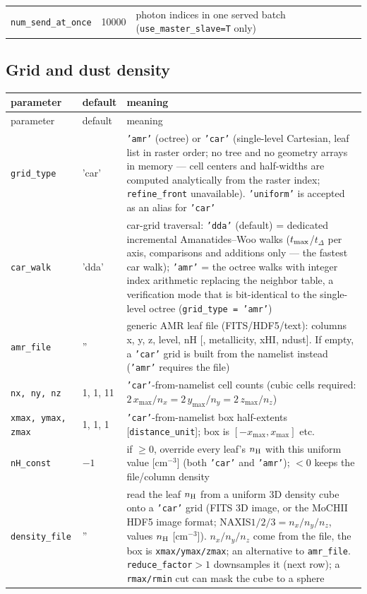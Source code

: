 \documentclass[english,a4paper]{my_memo}
\newcommand{\code}[1]{\texttt{#1}}
\begin{document}
{\begin{longtable}{llp{7.6cm}}
\code{num\_send\_at\_once} & 10000 & photon indices in one served batch (\code{use\_master\_slave=T} only) \\
\end{longtable}
}

\subsection{Grid and dust density}
\label{sec:grid}
{\small
\begin{longtable}{llp{7.2cm}}
\toprule
parameter & default & meaning \\
\midrule
\endfirsthead
\toprule
parameter & default & meaning \\
\midrule
\endhead
\bottomrule
\endlastfoot
\code{grid\_type} & 'car' & \code{'amr'} (octree) or \code{'car'} (single-level Cartesian, leaf list in raster order; no tree and no geometry arrays in memory --- cell centers and half-widths are computed analytically from the raster index; \code{refine\_front} unavailable).  \code{'uniform'} is accepted as an alias for \code{'car'} \\
\code{car\_walk}  & 'dda' & car-grid traversal: \code{'dda'} (default) = dedicated incremental Amanatides--Woo walks ($t_{\rm max}$/$t_\Delta$ per axis, comparisons and additions only --- the fastest car walk); \code{'amr'} = the octree walks with integer index arithmetic replacing the neighbor table, a verification mode that is bit-identical to the single-level octree (\code{grid\_type\,=\,'amr'}) \\
\code{amr\_file}  & ''    & generic AMR leaf file (FITS/HDF5/text): columns x, y, z, level, nH [, metallicity, xHI, ndust].  If empty, a \code{'car'} grid is built from the namelist instead (\code{'amr'} requires the file) \\
\code{nx, ny, nz} & 1, 1, 11 & \code{'car'}-from-namelist cell counts (cubic cells required: $2\,x_{\max}/n_x = 2\,y_{\max}/n_y = 2\,z_{\max}/n_z$) \\
\code{xmax, ymax, zmax} & 1, 1, 1 & \code{'car'}-from-namelist box half-extents [\code{distance\_unit}]; box is $[-x_{\max},x_{\max}]$ etc. \\
\code{nH\_const} & $-1$ & if $\ge 0$, override every leaf's $n_{\rm H}$ with this uniform value [cm$^{-3}$] (both \code{'car'} and \code{'amr'}); $<0$ keeps the file/column density \\
\code{density\_file} & '' & read the leaf $n_{\rm H}$ from a uniform 3D density cube onto a \code{'car'} grid (FITS 3D image, or the MoCHII HDF5 image format; NAXIS$1/2/3 = n_x/n_y/n_z$, values $n_{\rm H}$ [cm$^{-3}$]).  $n_x/n_y/n_z$ come from the file, the box is \code{xmax/ymax/zmax}; an alternative to \code{amr\_file}.  \code{reduce\_factor}$>1$ downsamples it (next row); a \code{rmax/rmin} cut can mask the cube to a sphere \\

\end{longtable}}
\end{document}
